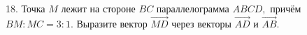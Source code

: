 18. Точка $M$ лежит на стороне $BC$ параллелограмма $ABCD,$ причём $BM:MC=3:1.$ Выразите вектор $\overrightarrow{MD}$ через векторы $\overrightarrow{AD}$ и $\overrightarrow{AB}.$\\
